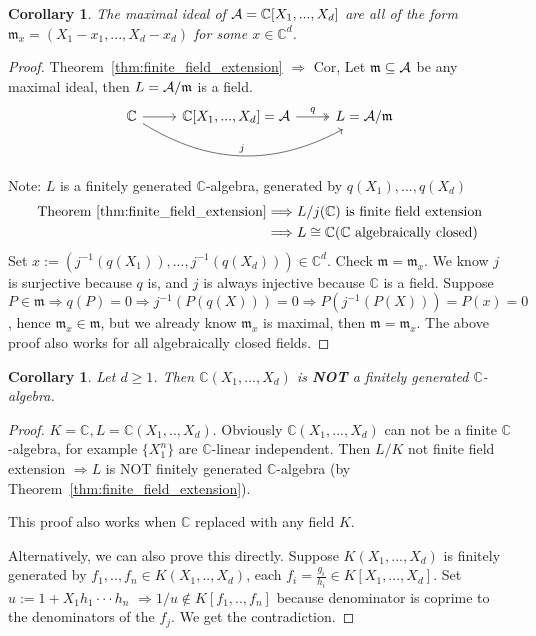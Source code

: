 \documentclass[11pt]{article}
\newtheorem{cor}[thm]{Corollary}
\newcommand{\cplx}{\mathbb C}
\newcommand{\scm}{{\mathfrak m}}
\newcommand{\cala}{{\cal A}}
\newcommand{\Lrta}{\Longrightarrow}
\begin{document}
\begin{cor}
The maximal ideal of $\cala=\cplx[X_1,...,X_d]$ are all of the form $\scm_x=(X_1-x_1,...,X_d-x_d)$ for some $x\in\cplx^d$.
\end{cor}
\begin{proof}
Theorem~\ref{thm:finite_field_extension} $\Lrta$ Cor, Let $\scm\subseteq \cala$ be any maximal ideal, then $ L=\cala/\scm$ is a field.
 \[
\begin{tikzcd}
\cplx\ar[r]\ar[rr,bend right,"j"]&\cplx[X_1,...,X_d]=\cala\ar[r,two heads,"q"]& L=\cala/\scm  
\end{tikzcd}
\] 
Note: $ L$ is a finitely generated $\cplx$-algebra, generated by $q(X_1),...,q(X_d)$
$$
\begin{aligned}
\text{Theorem~\ref{thm:finite_field_extension}}&\Lrta  L/j(\cplx)\text{ is finite field extension}\\
 & \Lrta
 L\cong \cplx \text{($\cplx$ algebraically closed)}
\end{aligned}
$$
Set $x:=(j^{-1}(q(X_1)),...,j^{-1}(q(X_d)))\in \cplx^d$. Check $\scm=\scm_x$.
We know $j$ is surjective because $q$ is, and $j$ is always injective because $\cplx$ is a field. Suppose $P\in \scm\Lrta q(P)=0\Lrta j^{-1}(P(q(X)))=0\Lrta P(j^{-1}(P(X)))=P(x)=0$, hence $\scm_x\in \scm$, but we already know $\scm_x$ is maximal, then $\scm=\scm_x$. The above proof also works for all algebraically closed fields.
\end{proof}

\begin{cor}\label{cor:rational_functions_not_fin.gen.alg}
Let $d\geq 1$. Then $\cplx(X_1,...,X_d)$ is \textbf{NOT} a finitely generated $\cplx$-algebra.
\end{cor}
\begin{proof}
$K=\cplx,  L=\cplx(X_1,..,X_d)$. Obviously $\cplx(X_1,...,X_d)$ can not be a finite $\cplx$-algebra, for example $\{X_1^n\}$ are $\cplx$-linear independent. Then $ L/K$ not finite field extension $\Lrta  L$ is NOT finitely generated $\cplx$-algebra (by Theorem~\ref{thm:finite_field_extension}).

This proof also works when $\cplx$ replaced with any field $K$.

Alternatively, we can also prove this directly. Suppose $K(X_1,...,X_d)$ is finitely generated by $f_1,..,f_n\in K(X_1,..,X_d)$, each $f_i=\frac{g_i}{h_i}\in K[X_1,...,X_d]$. Set $u:=1+X_1 h_1\cdot\cdot\cdot h_n$
$\Lrta 1/u\notin K[f_1,..,f_n]$ because denominator is coprime to the denominators of the $f_j$. We get the contradiction.
\end{proof}
\end{document}
